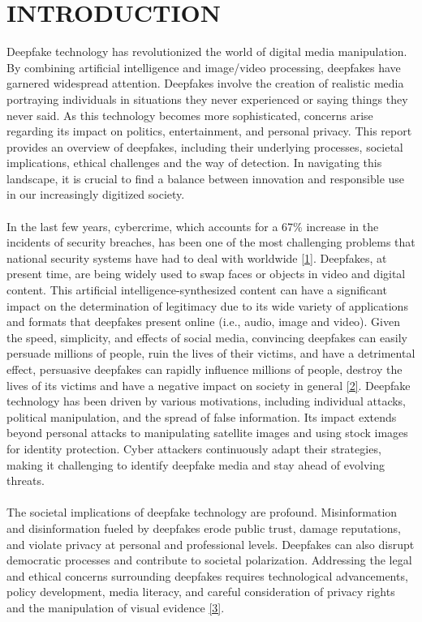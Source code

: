 

\section{INTRODUCTION}
Deepfake technology has revolutionized the world of digital media manipulation. By combining artificial intelligence and image/video processing, deepfakes have garnered widespread attention. Deepfakes involve the creation of realistic media portraying individuals in situations they never experienced or saying things they never said. As this technology becomes more sophisticated, concerns arise regarding its impact on politics, entertainment, and personal privacy. This report provides an overview of deepfakes, including their underlying processes, societal implications, ethical challenges and the way of detection. In navigating this landscape, it is crucial to find a balance between innovation and responsible use in our increasingly digitized society.
\\
\\
In the last few years, cybercrime, which accounts for a 67\% increase in the incidents of security breaches, has been one of the most challenging problems that national security systems have had to deal with worldwide \hyperref[ref1]{[1]}.
Deepfakes, at present time, are being widely used to swap faces or objects in video and digital content. This artificial intelligence-synthesized
content can have a significant impact on the determination of legitimacy due to its wide variety of applications and formats that deepfakes present online (i.e., audio, image and video).
Given the speed, simplicity, and effects of social media, convincing deepfakes can easily persuade millions of people, ruin the lives of their victims, and have a detrimental effect, persuasive deepfakes can rapidly influence millions of people, destroy the lives of its victims and have a negative impact on society in general \hyperref[ref2]{[2]}.
Deepfake technology has been driven by various motivations, including individual attacks, political manipulation, and the spread of false information. Its impact extends beyond personal attacks to manipulating satellite images and using stock images for identity protection. Cyber attackers continuously adapt their strategies, making it challenging to identify deepfake media and stay ahead of evolving threats.
\\\\
The societal implications of deepfake technology are profound. Misinformation and disinformation fueled by deepfakes erode public trust, damage reputations, and violate privacy at personal and professional levels. Deepfakes can also disrupt democratic processes and contribute to societal polarization. Addressing the legal and ethical concerns surrounding deepfakes requires technological advancements, policy development, media literacy, and careful consideration of privacy rights and the manipulation of visual evidence \hyperref[ref3]{[3]}.
